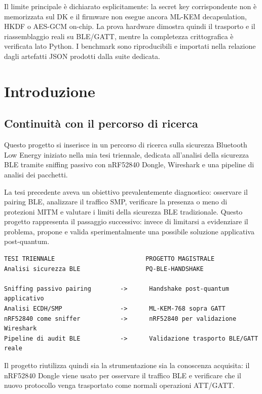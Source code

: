 \documentclass[11pt,a4paper]{article}
\begin{document}
Il limite principale è dichiarato esplicitamente: la secret key
corrispondente non è memorizzata sul DK e il firmware non esegue ancora
ML-KEM decapsulation, HKDF o AES-GCM on-chip. La prova hardware dimostra
quindi il trasporto e il riassemblaggio reali su BLE/GATT, mentre la
completezza crittografica è verificata lato Python. I benchmark sono
riproducibili e importati nella relazione dagli artefatti JSON prodotti
dalla suite dedicata.

\clearpage
\tableofcontents
\clearpage
{}

\section{Introduzione}\label{capitolo-1---introduzione}

\subsection{Continuità con il percorso di
ricerca}\label{continuituxe0-con-il-percorso-di-ricerca}

Questo progetto si inserisce in un percorso di ricerca sulla sicurezza
Bluetooth Low Energy iniziato nella mia tesi triennale, dedicata
all'analisi della sicurezza BLE tramite sniffing passivo con nRF52840
Dongle, Wireshark e una pipeline di analisi dei pacchetti.

La tesi precedente aveva un obiettivo prevalentemente diagnostico:
osservare il pairing BLE, analizzare il traffico SMP, verificare la
presenza o meno di protezioni MITM e valutare i limiti della sicurezza
BLE tradizionale. Questo progetto rappresenta il passaggio successivo:
invece di limitarsi a evidenziare il problema, propone e valida
sperimentalmente una possibile soluzione applicativa post-quantum.

\begin{lstlisting}
TESI TRIENNALE                         PROGETTO MAGISTRALE
Analisi sicurezza BLE                  PQ-BLE-HANDSHAKE

Sniffing passivo pairing        ->      Handshake post-quantum applicativo
Analisi ECDH/SMP                ->      ML-KEM-768 sopra GATT
nRF52840 come sniffer           ->      nRF52840 per validazione Wireshark
Pipeline di audit BLE           ->      Validazione trasporto BLE/GATT reale
\end{lstlisting}

Il progetto riutilizza quindi sia la strumentazione sia la conoscenza
acquisita: il nRF52840 Dongle viene usato per osservare il traffico BLE
e verificare che il nuovo protocollo venga trasportato come normali
operazioni ATT/GATT.
\end{document}
